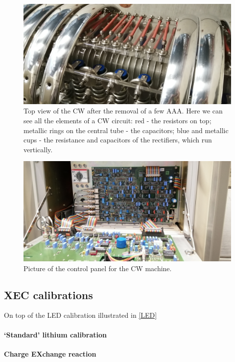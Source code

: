 \begin{refsection}
\begin{figure}
    \centering
    \includegraphics[width=1\textwidth]{Figures/MEG/CW/view_top.jpg}
    \caption{Top view of the CW after the removal of a few AAA. Here we can see all the elements of a CW circuit: red - the resistors on top; metallic rings on the central tube - the capacitors; blue and metallic cups - the resistance and capacitors of the rectifiers, which run vertically.}
    \label{fig:CW:view_top}
\end{figure}

\begin{figure}
    \centering
    \includegraphics[width=1\textwidth]{Figures/MEG/CW/panel.jpg}
    \caption{Picture of the control panel for the CW machine.}
    \label{fig:CW:panel}
\end{figure}

\subsection{XEC calibrations}
On top of the LED calibration illustrated in \ref{LED} 
\paragraph{`Standard' lithium calibration}
\paragraph{Charge EXchange reaction}

\end{refsection}
